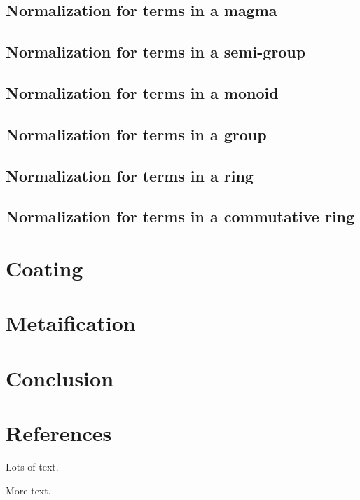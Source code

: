 \documentclass{sigplanconf}
\begin{document}
\subsection{Normalization for terms in a magma}

\subsection{Normalization for terms in a semi-group}

\subsection{Normalization for terms in a monoid}

\subsection{Normalization for terms in a group}

\subsection{Normalization for terms in a ring}

\subsection{Normalization for terms in a commutative ring}

\section{Coating}

\section{Metaification}

\section{Conclusion}

\section{References}






Lots of text.

More text.
\end{document}

